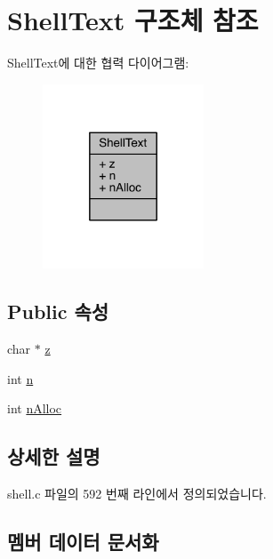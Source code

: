 \hypertarget{struct_shell_text}{}\section{Shell\+Text 구조체 참조}
\label{struct_shell_text}


Shell\+Text에 대한 협력 다이어그램\+:
\nopagebreak
\begin{figure}[H]
\begin{center}
\leavevmode
\includegraphics[width=136pt]{struct_shell_text__coll__graph}
\end{center}
\end{figure}
\subsection*{Public 속성}
\begin{DoxyCompactItemize}
\item 
char $\ast$ \hyperlink{struct_shell_text_ad7acc0c56c1066a865700d2f472b7069}{z}
\item 
int \hyperlink{struct_shell_text_a8b8addc0530be548b9f118dc90ef6d30}{n}
\item 
int \hyperlink{struct_shell_text_a44c20e5561668de289aa47e7d65e8ead}{n\+Alloc}
\end{DoxyCompactItemize}


\subsection{상세한 설명}


shell.\+c 파일의 592 번째 라인에서 정의되었습니다.



\subsection{멤버 데이터 문서화}
\mbox{\label{struct_shell_text_a8b8addc0530be548b9f118dc90ef6d30}} 
